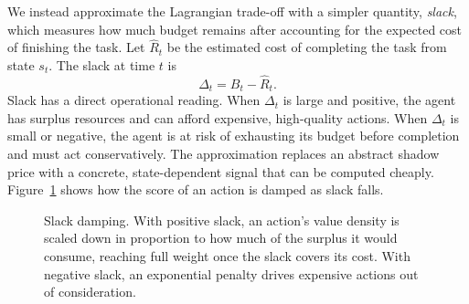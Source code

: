 \documentclass[11pt]{book}
\begin{document}
We instead approximate the Lagrangian trade-off with a simpler quantity, \emph{slack}, which measures how much budget remains after accounting for the expected cost of finishing the task. Let $\hat{R}_t$ be the estimated cost of completing the task from state $s_t$. The slack at time $t$ is
\[
\Delta_t = B_t - \hat{R}_t.
\]
Slack has a direct operational reading. When $\Delta_t$ is large and positive, the agent has surplus resources and can afford expensive, high-quality actions. When $\Delta_t$ is small or negative, the agent is at risk of exhausting its budget before completion and must act conservatively. The approximation replaces an abstract shadow price with a concrete, state-dependent signal that can be computed cheaply. Figure~\ref{fig:slack-damping} shows how the score of an action is damped as slack falls.

\begin{figure}[htbp]
\centering
{}
\caption{Slack damping. With positive slack, an action's value density is scaled down in proportion to how much of the surplus it would consume, reaching full weight once the slack covers its cost. With negative slack, an exponential penalty drives expensive actions out of consideration.}
\label{fig:slack-damping}
\end{figure}
\end{document}
